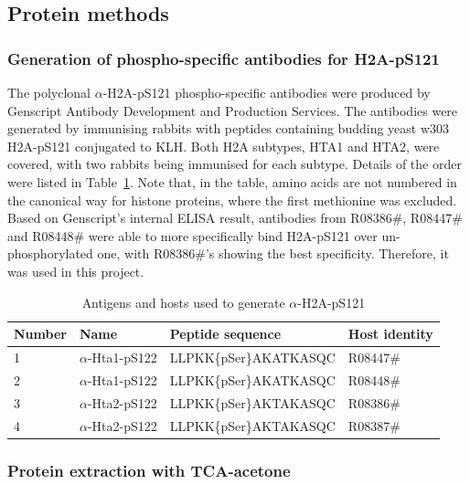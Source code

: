 
\subsection{Protein methods}
\subsubsection{Generation of phospho-specific antibodies for H2A-pS121}

The polyclonal $\alpha$-H2A-pS121 phospho-specific antibodies were produced by Genscript Antibody Development and Production Services. The antibodies were generated by immunising rabbits with peptides containing budding yeast w303 H2A-pS121 conjugated to KLH. Both H2A subtypes, HTA1 and HTA2, were covered, with two rabbits being immunised for each subtype. Details of the order were listed in Table~\ref{tab:genscript}. Note that, in the table, amino acids are not numbered in the canonical way for histone proteins, where the first methionine was excluded. Based on Genscript's internal ELISA result, antibodies from R08386\#, R08447\# and R08448\# were able to more specifically bind H2A-pS121 over un-phosphorylated one, with R08386\#'s showing the best specificity. Therefore, it was used in this project. 

\begin{table}[htbp]
\centering
\caption{Antigens and hosts used to generate $\alpha$-H2A-pS121}
\label{tab:genscript}
\begin{tabular}{llll}
\hline
\textbf{Number} & \textbf{Name} & \textbf{Peptide sequence} & \textbf{Host identity} \\ \hline
1 & $\alpha$-Hta1-pS122 & LLPKK\{pSer\}AKATKASQC & R08447\# \\   
2 & $\alpha$-Hta1-pS122 & LLPKK\{pSer\}AKATKASQC & R08448\# \\   
3 & $\alpha$-Hta2-pS122 & LLPKK\{pSer\}AKTAKASQC & R08386\# \\   
4 & $\alpha$-Hta2-pS122 & LLPKK\{pSer\}AKTAKASQC & R08387\# \\   
\end{tabular}
\end{table}


\subsubsection{Protein extraction with TCA-acetone}

